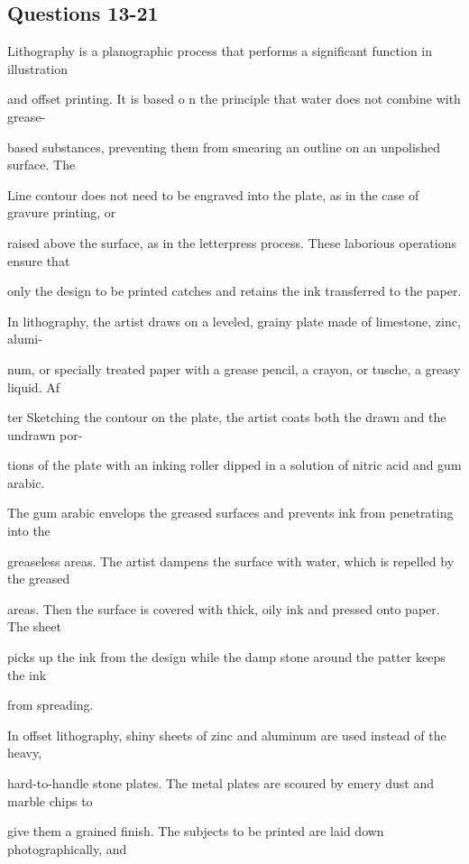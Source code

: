 \documentclass[12pt]{article}
\begin{document}
\subsection*{Questions 13-21}
\begingroup
\small
\sloppy
\setlength{\parskip}{0pt}
\setlength{\parindent}{0pt}
Lithography is a planographic process that performs a significant function in illustration\par
and offset printing. It is based o n the principle that water does not combine with grease-\par
based substances, preventing them from smearing an outline on an unpolished surface. The\par
Line contour does not need to be engraved into the plate, as in the case of gravure printing, or\par
raised above the surface, as in the letterpress process. These laborious operations ensure that\par
only the design to be printed catches and retains the ink transferred to the paper.\par
In lithography, the artist draws on a leveled, grainy plate made of limestone, zinc, alumi-\par
num, or specially treated paper with a grease pencil, a crayon, or tusche, a greasy liquid. Af\par
ter Sketching the contour on the plate, the artist coats both the drawn and the undrawn por-\par
tions of the plate with an inking roller dipped in a solution of nitric acid and gum arabic.\par
The gum arabic envelops the greased surfaces and prevents ink from penetrating into the\par
greaseless areas. The artist dampens the surface with water, which is repelled by the greased\par
areas. Then the surface is covered with thick, oily ink and pressed onto paper. The sheet\par
picks up the ink from the design while the damp stone around the patter keeps the ink\par
from spreading.\par
In offset lithography, shiny sheets of zinc and aluminum are used instead of the heavy,\par
hard-to-handle stone plates. The metal plates are scoured by emery dust and marble chips to\par
give them a grained finish. The subjects to be printed are laid down photographically, and\par
\end{document}
